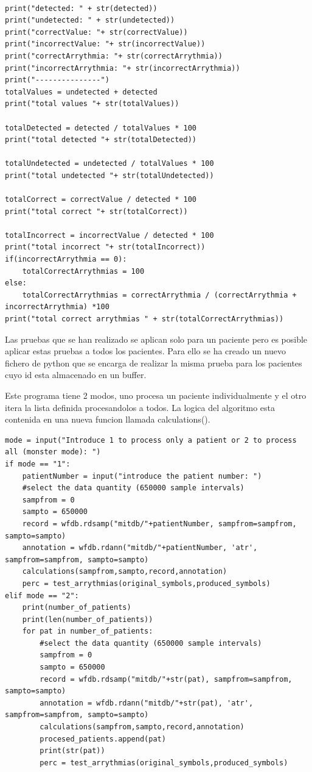 \lstset{language=python, breaklines=true, basicstyle=\footnotesize}
\begin{lstlisting}[frame=single]

print("detected: " + str(detected))
print("undetected: " + str(undetected))
print("correctValue: "+ str(correctValue))
print("incorrectValue: "+ str(incorrectValue))
print("correctArrythmia: "+ str(correctArrythmia))
print("incorrectArrythmia: "+ str(incorrectArrythmia))
print("---------------")
totalValues = undetected + detected
print("total values "+ str(totalValues))

totalDetected = detected / totalValues * 100
print("total detected "+ str(totalDetected))

totalUndetected = undetected / totalValues * 100
print("total undetected "+ str(totalUndetected))

totalCorrect = correctValue / detected * 100
print("total correct "+ str(totalCorrect))

totalIncorrect = incorrectValue / detected * 100
print("total incorrect "+ str(totalIncorrect))       
if(incorrectArrythmia == 0):
    totalCorrectArrythmias = 100
else:
    totalCorrectArrythmias = correctArrythmia / (correctArrythmia + incorrectArrythmia) *100
print("total correct arrythmias " + str(totalCorrectArrythmias))
\end{lstlisting}

Las pruebas que se han realizado se aplican solo para un paciente pero es posible aplicar estas pruebas a todos los pacientes.
Para ello se ha creado un nuevo fichero de python que se encarga de realizar la misma prueba para los pacientes cuyo id esta
almacenado en un buffer.

Este programa tiene 2 modos, uno procesa un paciente individualmente y el otro itera la lista definida procesandolos a todos. La
logica del algoritmo esta contenida en una nueva funcion llamada calculations().

\lstset{language=python, breaklines=true, basicstyle=\footnotesize}
\begin{lstlisting}[frame=single]
    mode = input("Introduce 1 to process only a patient or 2 to process all (monster mode): ")
if mode == "1":
    patientNumber = input("introduce the patient number: ")
    #select the data quantity (650000 sample intervals)
    sampfrom = 0
    sampto = 650000
    record = wfdb.rdsamp("mitdb/"+patientNumber, sampfrom=sampfrom, sampto=sampto)
    annotation = wfdb.rdann("mitdb/"+patientNumber, 'atr', sampfrom=sampfrom, sampto=sampto)
    calculations(sampfrom,sampto,record,annotation)
    perc = test_arrythmias(original_symbols,produced_symbols)
elif mode == "2":
    print(number_of_patients)
    print(len(number_of_patients))
    for pat in number_of_patients:
        #select the data quantity (650000 sample intervals)
        sampfrom = 0
        sampto = 650000
        record = wfdb.rdsamp("mitdb/"+str(pat), sampfrom=sampfrom, sampto=sampto)
        annotation = wfdb.rdann("mitdb/"+str(pat), 'atr', sampfrom=sampfrom, sampto=sampto)
        calculations(sampfrom,sampto,record,annotation)
        procesed_patients.append(pat)
        print(str(pat))
        perc = test_arrythmias(original_symbols,produced_symbols)
\end{lstlisting}

